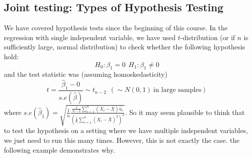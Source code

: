 \documentclass[12pt]{article}
\theoremstyle{definition}
\theoremstyle{property}
\theoremstyle{assumption}
\theoremstyle{example}
\theoremstyle{comment}
\begin{document}
\subsection{Joint testing: Types of Hypothesis Testing}
We have covered hypothesis tests since the beginning of this course. In the regression with single independent variable, we have used $t$-distribution (or if $n$ is sufficiently large, normal distribution) to check whether the following hypothesis hold:
\[
H_0 : \beta_1 = 0 \ \ H_1 : \beta_1 \neq 0
\]
and the test statistic was (assuming homoskedasticity)
\[
t=\frac{\hat{\beta}_1-0}{s.e(\hat{\beta})}\sim t_{n-2} \ \ (\sim N(0,1) \ \text{in large samples})
\]
where $s.e(\hat{\beta}_1)=\sqrt{\frac{1}{n}\frac{\frac{1}{n-2}\sum_{i=1}^n(X_i-\bar{X})\hat{u}_i}{(\frac{1}{n}\sum_{i=1}^n (X_i-\bar{X})^2)^2}}$. So it may seem plausible to think that to test the hypothesis on a setting where we have multiple independent variables, we just need to run this many times. However, this is not exactly the case. the following example demonstrates why. \\ \par
\end{document}
